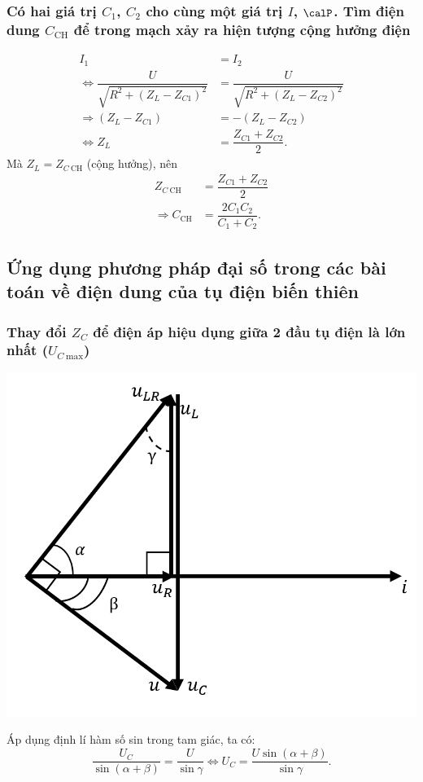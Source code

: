 \subsubsection{Có hai giá trị $C_1$, $C_2$ cho cùng một giá trị $I$, $\calP$. Tìm điện dung $C_\text{CH}$ để trong mạch xảy ra hiện tượng cộng hưởng điện}
\begin{align*}
	I_1 &= I_2 \\
	\Leftrightarrow \dfrac{U}{\sqrt{R^2 + (Z_{L}-Z_{C1})^2}}&=\dfrac{U}{\sqrt{R^2+(Z_{L}-Z_{C2})^2}}\\
	\Rightarrow (Z_{L}-Z_{C1})&=-(Z_{L}-Z_{C2})\\
	\Leftrightarrow Z_L &= \dfrac{Z_{C1}+Z_{C2}}{2}.	
\end{align*}
Mà $Z_L = Z_{C\ \text{CH}}$ (cộng hưởng), nên
\begin{align*}
	Z_{C\ \text{CH}}&= \dfrac{Z_{C1}+Z_{C2}}{2} \\
	\Rightarrow {C_\text{CH}}&= \dfrac{2C_1C_2}{C_1 + C_2}.
\end{align*}

\subsection{Ứng dụng phương pháp đại số trong các bài toán về điện dung của tụ điện biến thiên}
\subsubsection{Thay đổi $Z_C$ để điện áp hiệu dụng giữa 2 đầu tụ điện là lớn nhất ($U_{C\ \text{max}}$)}
\begin{center}
	\includegraphics[scale=0.45]{../figs/VN12-PH-19-A-011-6-V2-1.png}
\end{center}
Áp dụng định lí hàm số sin trong tam giác, ta có:
\begin{equation*}
	\dfrac{U_C}{\sin(\alpha+\beta)}= \dfrac{U}{\sin \gamma}
	\Leftrightarrow U_C = \dfrac{U\sin(\alpha+\beta)}{ \sin \gamma}.
\end{equation*}

